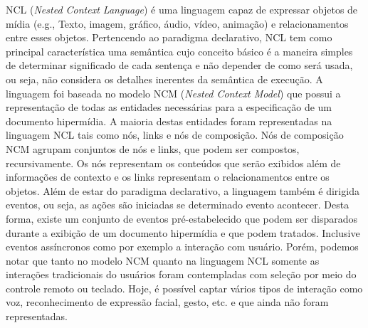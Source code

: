 NCL (\textit{Nested Context Language}) é uma linguagem capaz de expressar objetos de mídia (e.g., Texto, imagem, gráfico, áudio, vídeo, animação) e relacionamentos entre esses objetos. Pertencendo ao paradigma declarativo, NCL tem como principal característica uma semântica cujo conceito básico é a maneira simples de determinar significado de cada sentença e não depender de como será usada, ou seja, não considera os detalhes inerentes da semântica de execução. A linguagem foi baseada no modelo NCM (\textit{Nested Context Model})  que possui a representação de todas as entidades necessárias para a especificação de um documento hipermídia. A maioria destas entidades foram representadas na linguagem NCL tais como nós, links e nós de composição. Nós de composição NCM agrupam conjuntos de nós e links, que podem ser compostos, recursivamente. Os nós representam os conteúdos que serão exibidos além de informações de contexto e os links representam o relacionamentos entre os objetos. Além de estar do paradigma declarativo, a linguagem também é dirigida eventos, ou seja, as ações são iniciadas se determinado evento acontecer. Desta forma, existe um conjunto de eventos pré-estabelecido que podem ser disparados durante a exibição de um documento hipermídia e que podem tratados. Inclusive eventos assíncronos como por exemplo a interação com usuário. 
Porém, podemos notar que tanto no modelo NCM quanto na linguagem NCL somente as interações tradicionais do usuários foram contempladas com seleção por meio do controle remoto ou teclado. Hoje, é possível captar vários tipos de interação como voz, reconhecimento de expressão facial, gesto, etc. e que ainda não foram representadas. 
